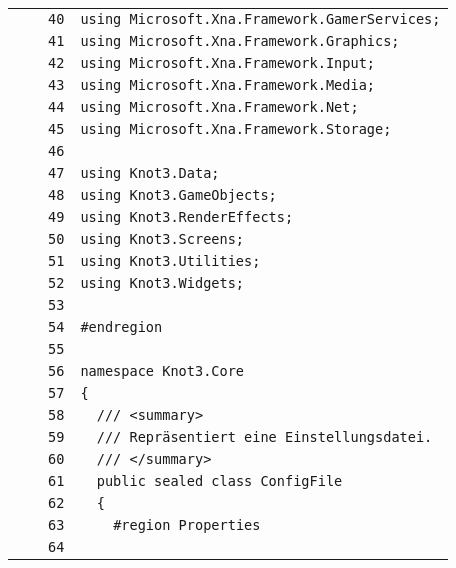 \documentclass[a4paper,10pt]{article}
\begin{document}
\begin{longtable}[l]{lrrl}
\cellcolor{gray} &  & \verb~40~ & \verb~using Microsoft.Xna.Framework.GamerServices;~\\
\cellcolor{gray} &  & \verb~41~ & \verb~using Microsoft.Xna.Framework.Graphics;~\\
\cellcolor{gray} &  & \verb~42~ & \verb~using Microsoft.Xna.Framework.Input;~\\
\cellcolor{gray} &  & \verb~43~ & \verb~using Microsoft.Xna.Framework.Media;~\\
\cellcolor{gray} &  & \verb~44~ & \verb~using Microsoft.Xna.Framework.Net;~\\
\cellcolor{gray} &  & \verb~45~ & \verb~using Microsoft.Xna.Framework.Storage;~\\
\cellcolor{gray} &  & \verb~46~ & \verb~~\\
\cellcolor{gray} &  & \verb~47~ & \verb~using Knot3.Data;~\\
\cellcolor{gray} &  & \verb~48~ & \verb~using Knot3.GameObjects;~\\
\cellcolor{gray} &  & \verb~49~ & \verb~using Knot3.RenderEffects;~\\
\cellcolor{gray} &  & \verb~50~ & \verb~using Knot3.Screens;~\\
\cellcolor{gray} &  & \verb~51~ & \verb~using Knot3.Utilities;~\\
\cellcolor{gray} &  & \verb~52~ & \verb~using Knot3.Widgets;~\\
\cellcolor{gray} &  & \verb~53~ & \verb~~\\
\cellcolor{gray} &  & \verb~54~ & \verb~#endregion~\\
\cellcolor{gray} &  & \verb~55~ & \verb~~\\
\cellcolor{gray} &  & \verb~56~ & \verb~namespace Knot3.Core~\\
\cellcolor{gray} &  & \verb~57~ & \verb~{~\\
\cellcolor{gray} &  & \verb~58~ & \verb~  /// <summary>~\\
\cellcolor{gray} &  & \verb~59~ & \verb~  /// Repräsentiert eine Einstellungsdatei.~\\
\cellcolor{gray} &  & \verb~60~ & \verb~  /// </summary>~\\
\cellcolor{gray} &  & \verb~61~ & \verb~  public sealed class ConfigFile~\\
\cellcolor{gray} &  & \verb~62~ & \verb~  {~\\
\cellcolor{gray} &  & \verb~63~ & \verb~    #region Properties~\\
\cellcolor{gray} &  & \verb~64~ & \verb~~\\

\end{longtable}
\end{document}
